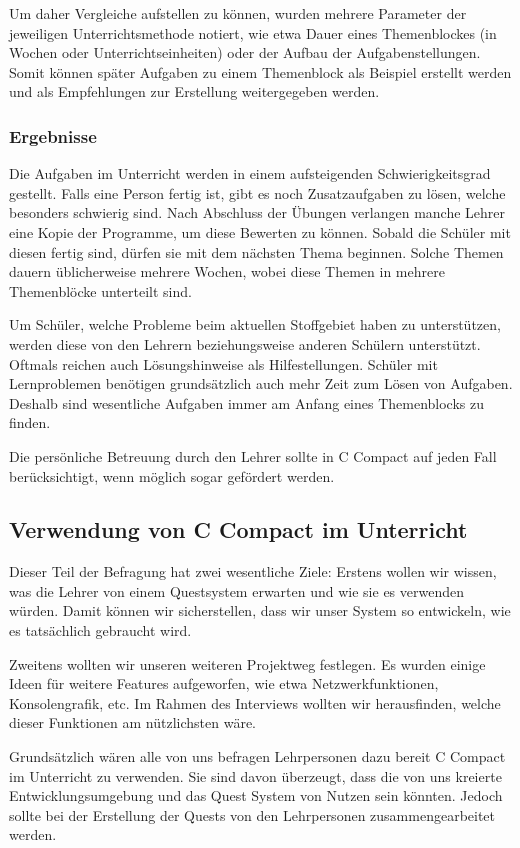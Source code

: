 Um daher Vergleiche aufstellen zu können, wurden mehrere Parameter der jeweiligen Unterrichtsmethode notiert, wie etwa Dauer eines Themenblockes (in Wochen oder Unterrichtseinheiten) oder der Aufbau der Aufgabenstellungen. Somit können später Aufgaben zu einem Themenblock als Beispiel erstellt werden und als Empfehlungen zur Erstellung weitergegeben werden.

\subsubsection*{Ergebnisse}

Die Aufgaben im Unterricht werden in einem aufsteigenden Schwierigkeitsgrad gestellt. Falls eine Person fertig ist, gibt es noch Zusatzaufgaben zu lösen, welche besonders schwierig sind. Nach Abschluss der Übungen verlangen manche Lehrer eine Kopie der Programme, um diese Bewerten zu können. Sobald die Schüler mit diesen fertig sind, dürfen sie mit dem nächsten Thema beginnen.
Solche Themen dauern üblicherweise mehrere Wochen, wobei diese Themen in mehrere Themenblöcke unterteilt sind.

Um Schüler, welche Probleme beim aktuellen Stoffgebiet haben zu unterstützen, werden diese von den Lehrern beziehungsweise anderen Schülern unterstützt. Oftmals reichen auch Lösungshinweise als Hilfestellungen. Schüler mit Lernproblemen benötigen grundsätzlich auch mehr Zeit zum Lösen von Aufgaben. Deshalb sind wesentliche Aufgaben immer am Anfang eines Themenblocks zu finden.

Die persönliche Betreuung durch den Lehrer sollte in C Compact auf jeden Fall berücksichtigt, wenn möglich sogar gefördert werden.

\subsection{Verwendung von C Compact im Unterricht}
Dieser Teil der Befragung hat zwei wesentliche Ziele: Erstens wollen wir wissen, was die Lehrer von einem Questsystem erwarten und wie sie es verwenden würden. Damit können wir sicherstellen, dass wir unser System so entwickeln, wie es tatsächlich gebraucht wird.

Zweitens wollten wir unseren weiteren Projektweg festlegen. Es wurden einige Ideen für weitere Features aufgeworfen, wie etwa Netzwerkfunktionen, Konsolengrafik, etc. Im Rahmen des Interviews wollten wir herausfinden, welche dieser Funktionen am nützlichsten wäre.

Grundsätzlich wären alle von uns befragen Lehrpersonen dazu bereit C Compact im Unterricht zu verwenden. Sie sind davon überzeugt, dass die von uns kreierte Entwicklungsumgebung und das Quest System von Nutzen sein könnten. Jedoch sollte bei der Erstellung der Quests von den Lehrpersonen zusammengearbeitet werden.

